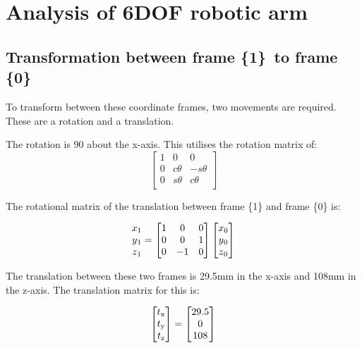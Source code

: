 \documentclass [11pt]{report}
\begin{document}
\chapter{Analysis of 6DOF robotic arm}

\section{Transformation between frame \{1\}\, to frame \{0\}}

To transform between these coordinate frames, two movements are required. These are a rotation and a translation.

The rotation is 90{\degree} about the x-axis. This utilises the rotation matrix of: 
$$
\begin{bmatrix}
1&0&0\\
0&c{\theta}&-s{\theta}\\
0&s{\theta}&c{\theta}\\
\end{bmatrix}
$$

The rotational matrix of the translation between frame \{1\} and frame \{0\} is:

\begin{equation*}
\begin{matrix}
x\textsubscript{1}\\
y\textsubscript{1}\\
z\textsubscript{1}\\
\end{matrix}
= 
\begin{bmatrix}
1&0&0\\
0&0&1\\
0&-1&0\\
\end{bmatrix}
\begin{bmatrix}
x\textsubscript{0}\\
y\textsubscript{0}\\
z\textsubscript{0}\\
\end{bmatrix}
\end{equation*}

The translation between these two frames is 29.5mm in the x-axis and 108mm in the z-axis. The translation matrix for this is:

\begin{equation*}
\begin{bmatrix}
t\textsubscript{x}\\
t\textsubscript{y}\\
t\textsubscript{z}\\
\end{bmatrix}
=
\begin{bmatrix}
29.5\\
0\\
108\\
\end{bmatrix}
\end{equation*}
\end{document}

